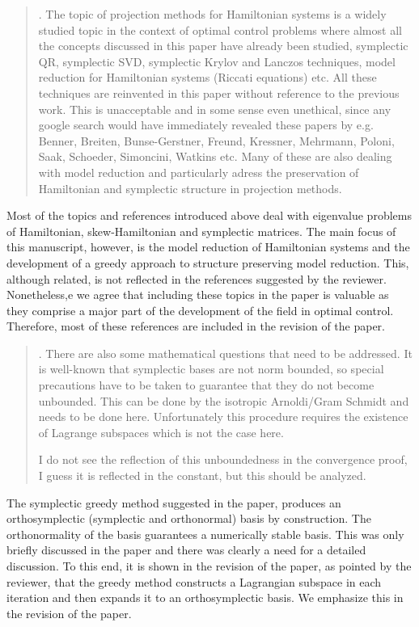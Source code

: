 \documentclass[a4paper]{article}
\newcommand{\breview}{\begin{quotation}\begin{bf}\noindent}
\newcommand{\ereview}{\end{bf}\end{quotation}}
\begin{document}
\breview
1. The topic of projection methods for Hamiltonian systems is a widely studied topic in the context of optimal control problems where almost all the concepts discussed in this paper have already been studied, symplectic QR, symplectic SVD, symplectic Krylov and Lanczos techniques, model reduction for Hamiltonian systems (Riccati equations) etc. All these techniques are reinvented in this paper without reference to the previous work. This is unacceptable and in some sense even unethical, since any google search would have immediately revealed these papers by e.g. Benner, Breiten, Bunse-Gerstner, Freund, Kressner, Mehrmann, Poloni, Saak, Schoeder, Simoncini, Watkins etc. Many of these are also dealing with model reduction and particularly adress the preservation of Hamiltonian and symplectic structure in projection methods.
\ereview

Most of the topics and references introduced above deal with eigenvalue problems of Hamiltonian, skew-Hamiltonian and symplectic matrices. The main focus of this manuscript, however, is the model reduction of Hamiltonian systems and the development of a greedy approach to structure preserving model reduction. This, although related, is not reflected in the references suggested by the reviewer. Nonetheless,e we agree that including these topics in the paper is valuable as they comprise a major part of the development of the field in optimal control. Therefore, most of these references are included in the revision of the paper.

\breview
2. There are also some mathematical questions that need to be addressed. It is well-known that symplectic bases are not norm bounded, so special precautions have to be taken to guarantee that they do not become unbounded. This can be done by the isotropic Arnoldi/Gram Schmidt and needs to be done here. Unfortunately this procedure requires the existence of Lagrange subspaces which is not the case here.

I do not see the reflection of this unboundedness in the convergence proof, I guess it is reflected in the constant, but this should be analyzed. 
\ereview
The symplectic greedy method suggested in the paper, produces an orthosymplectic (symplectic and orthonormal) basis by construction. The orthonormality of the basis guarantees a numerically stable basis. This was only briefly discussed in the paper and there was clearly a need for a detailed discussion. To this end, it is shown in the revision of the paper, as pointed by the reviewer, that the greedy method constructs a Lagrangian subspace in each iteration and then expands it to an orthosymplectic basis. We emphasize this in the revision of the paper.
\end{document}

